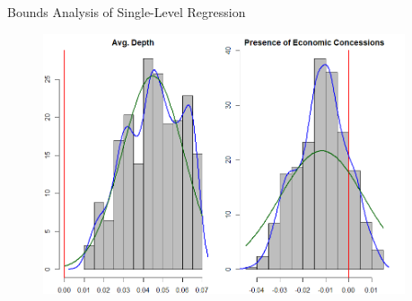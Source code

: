 \documentclass[12pt]{beamer}
\begin{document}


\begin{frame}{Bounds Analysis of Single-Level Regression}

\begin{figure}[htbp]
	\centering
		\includegraphics[width=0.95\textwidth]{eba-single-level.png}
\end{figure}


\end{frame}









\end{document}
